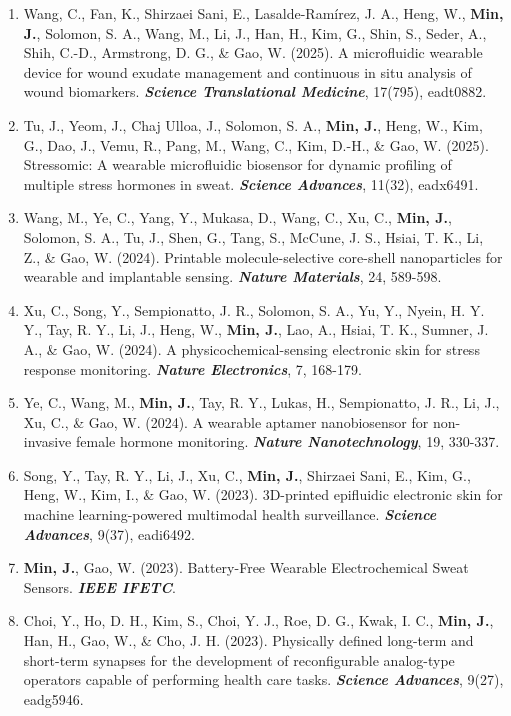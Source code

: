 \documentclass[11pt,a4paper]{article}
\begin{document}
\begin{enumerate}[leftmargin=*, itemsep=2pt, parsep=0pt, topsep=2pt]
  \item Wang, C., Fan, K., Shirzaei Sani, E., Lasalde-Ramírez, J. A., Heng, W., \textbf{Min, J.}, Solomon, S. A., Wang, M., Li, J., Han, H., Kim, G., Shin, S., Seder, A., Shih, C.-D., Armstrong, D. G., \& Gao, W. (2025). A microfluidic wearable device for wound exudate management and continuous in situ analysis of wound biomarkers. \textbf{\textit{Science Translational Medicine}}, 17(795), eadt0882.
  \item Tu, J., Yeom, J., Chaj Ulloa, J., Solomon, S. A., \textbf{Min, J.}, Heng, W., Kim, G., Dao, J., Vemu, R., Pang, M., Wang, C., Kim, D.-H., \& Gao, W. (2025). Stressomic: A wearable microfluidic biosensor for dynamic profiling of multiple stress hormones in sweat. \textbf{\textit{Science Advances}}, 11(32), eadx6491.
  \item Wang, M., Ye, C., Yang, Y., Mukasa, D., Wang, C., Xu, C., \textbf{Min, J.}, Solomon, S. A., Tu, J., Shen, G., Tang, S., McCune, J. S., Hsiai, T. K., Li, Z., \& Gao, W. (2024). Printable molecule-selective core-shell nanoparticles for wearable and implantable sensing. \textbf{\textit{Nature Materials}}, 24, 589-598.
  \item Xu, C., Song, Y., Sempionatto, J. R., Solomon, S. A., Yu, Y., Nyein, H. Y. Y., Tay, R. Y., Li, J., Heng, W., \textbf{Min, J.}, Lao, A., Hsiai, T. K., Sumner, J. A., \& Gao, W. (2024). A physicochemical-sensing electronic skin for stress response monitoring. \textbf{\textit{Nature Electronics}}, 7, 168-179.
  \item Ye, C., Wang, M., \textbf{Min, J.}, Tay, R. Y., Lukas, H., Sempionatto, J. R., Li, J., Xu, C., \& Gao, W. (2024). A wearable aptamer nanobiosensor for non-invasive female hormone monitoring. \textbf{\textit{Nature Nanotechnology}}, 19, 330-337.
  \item Song, Y., Tay, R. Y., Li, J., Xu, C., \textbf{Min, J.}, Shirzaei Sani, E., Kim, G., Heng, W., Kim, I., \& Gao, W. (2023). 3D-printed epifluidic electronic skin for machine learning-powered multimodal health surveillance. \textbf{\textit{Science Advances}}, 9(37), eadi6492.
  \item \textbf{Min, J.}, Gao, W. (2023). Battery-Free Wearable Electrochemical Sweat Sensors. \textbf{\textit{IEEE IFETC}}.
  \item Choi, Y., Ho, D. H., Kim, S., Choi, Y. J., Roe, D. G., Kwak, I. C., \textbf{Min, J.}, Han, H., Gao, W., \& Cho, J. H. (2023). Physically defined long-term and short-term synapses for the development of reconfigurable analog-type operators capable of performing health care tasks. \textbf{\textit{Science Advances}}, 9(27), eadg5946.

\end{enumerate}
\end{document}
